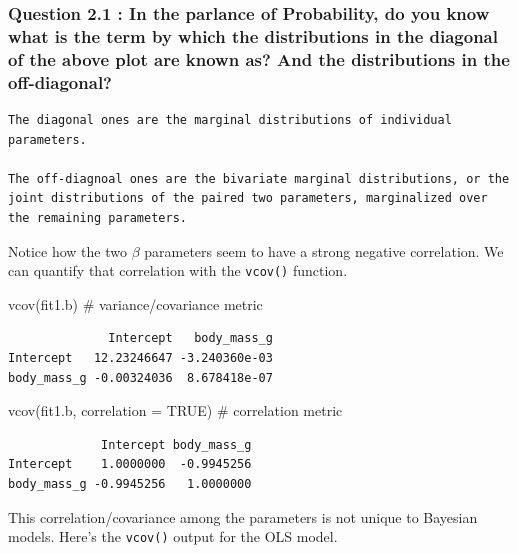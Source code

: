 \documentclass[
  letterpaper,
  DIV=11,
  numbers=noendperiod]{scrartcl}
\newenvironment{Shaded}{\begin{snugshade}}{\end{snugshade}}
\newcommand{\AttributeTok}[1]{\textcolor[rgb]{0.40,0.45,0.13}{#1}}
\newcommand{\CommentTok}[1]{\textcolor[rgb]{0.37,0.37,0.37}{#1}}
\newcommand{\ConstantTok}[1]{\textcolor[rgb]{0.56,0.35,0.01}{#1}}
\newcommand{\FunctionTok}[1]{\textcolor[rgb]{0.28,0.35,0.67}{#1}}
\newcommand{\NormalTok}[1]{\textcolor[rgb]{0.00,0.23,0.31}{#1}}
\begin{document}
\subsubsection{Question 2.1 : In the parlance of Probability, do you
know what is the term by which the distributions in the diagonal of the
above plot are known as? And the distributions in the
off-diagonal?}\label{question-2.1-in-the-parlance-of-probability-do-you-know-what-is-the-term-by-which-the-distributions-in-the-diagonal-of-the-above-plot-are-known-as-and-the-distributions-in-the-off-diagonal}

\begin{verbatim}
The diagonal ones are the marginal distributions of individual parameters.

The off-diagnoal ones are the bivariate marginal distributions, or the joint distributions of the paired two parameters, marginalized over the remaining parameters.
\end{verbatim}

Notice how the two \(\beta\) parameters seem to have a strong negative
correlation. We can quantify that correlation with the \texttt{vcov()}
function.

\begin{Shaded}
\begin{Highlighting}[]
\FunctionTok{vcov}\NormalTok{(fit1.b)                      }\CommentTok{\# variance/covariance metric}
\end{Highlighting}
\end{Shaded}

\begin{verbatim}
              Intercept   body_mass_g
Intercept   12.23246647 -3.240360e-03
body_mass_g -0.00324036  8.678418e-07
\end{verbatim}

\begin{Shaded}
\begin{Highlighting}[]
\FunctionTok{vcov}\NormalTok{(fit1.b, }\AttributeTok{correlation =} \ConstantTok{TRUE}\NormalTok{)  }\CommentTok{\# correlation metric}
\end{Highlighting}
\end{Shaded}

\begin{verbatim}
             Intercept body_mass_g
Intercept    1.0000000  -0.9945256
body_mass_g -0.9945256   1.0000000
\end{verbatim}

This correlation/covariance among the parameters is not unique to
Bayesian models. Here's the \texttt{vcov()} output for the OLS model.
\end{document}
